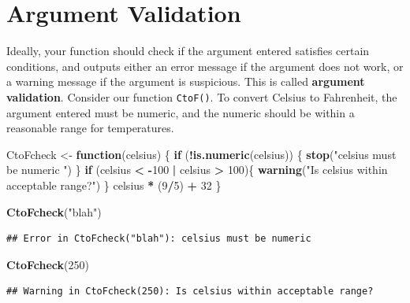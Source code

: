 \documentclass[
]{book}
\newenvironment{Shaded}{\begin{snugshade}}{\end{snugshade}}
\newcommand{\ControlFlowTok}[1]{\textcolor[rgb]{0.13,0.29,0.53}{\textbf{#1}}}
\newcommand{\DecValTok}[1]{\textcolor[rgb]{0.00,0.00,0.81}{#1}}
\newcommand{\FunctionTok}[1]{\textcolor[rgb]{0.13,0.29,0.53}{\textbf{#1}}}
\newcommand{\NormalTok}[1]{#1}
\newcommand{\OtherTok}[1]{\textcolor[rgb]{0.56,0.35,0.01}{#1}}
\newcommand{\SpecialCharTok}[1]{\textcolor[rgb]{0.81,0.36,0.00}{\textbf{#1}}}
\newcommand{\StringTok}[1]{\textcolor[rgb]{0.31,0.60,0.02}{#1}}
\theoremstyle{definition}
\theoremstyle{definition}
\theoremstyle{definition}
\theoremstyle{definition}
\theoremstyle{remark}
\begin{document}
\hypertarget{validation}{%
\section{Argument Validation}\label{validation}}

Ideally, your function should check if the argument entered satisfies certain conditions, and outputs either an error message if the argument does not work, or a warning message if the argument is suspicious. This is called \textbf{argument validation}. Consider our function \texttt{CtoF()}. To convert Celsius to Fahrenheit, the argument entered must be numeric, and the numeric should be within a reasonable range for temperatures.

\begin{Shaded}
\begin{Highlighting}[]
\NormalTok{CtoFcheck }\OtherTok{\textless{}{-}} \ControlFlowTok{function}\NormalTok{(celsius) \{}
  \ControlFlowTok{if}\NormalTok{ (}\SpecialCharTok{!}\FunctionTok{is.numeric}\NormalTok{(celsius)) \{}
    \FunctionTok{stop}\NormalTok{(}\StringTok{"celsius must be numeric "}\NormalTok{)}
\NormalTok{  \}}
  \ControlFlowTok{if}\NormalTok{ (celsius }\SpecialCharTok{\textless{}} \SpecialCharTok{{-}}\DecValTok{100} \SpecialCharTok{|}\NormalTok{ celsius }\SpecialCharTok{\textgreater{}} \DecValTok{100}\NormalTok{)\{}
    \FunctionTok{warning}\NormalTok{(}\StringTok{"Is celsius within acceptable range?"}\NormalTok{)}
\NormalTok{  \}}
\NormalTok{  celsius }\SpecialCharTok{*}\NormalTok{ (}\DecValTok{9}\SpecialCharTok{/}\DecValTok{5}\NormalTok{) }\SpecialCharTok{+} \DecValTok{32}
\NormalTok{\}}

\FunctionTok{CtoFcheck}\NormalTok{(}\StringTok{"blah"}\NormalTok{)}
\end{Highlighting}
\end{Shaded}

\begin{verbatim}
## Error in CtoFcheck("blah"): celsius must be numeric
\end{verbatim}

\begin{Shaded}
\begin{Highlighting}[]
\FunctionTok{CtoFcheck}\NormalTok{(}\DecValTok{250}\NormalTok{)}
\end{Highlighting}
\end{Shaded}

\begin{verbatim}
## Warning in CtoFcheck(250): Is celsius within acceptable range?
\end{verbatim}
\end{document}
